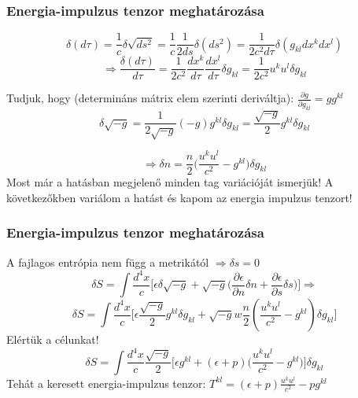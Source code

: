 \documentclass{beamer}
\begin{document}
\begin{frame}
\frametitle{Energia-impulzus tenzor meghatározása}
\begin{equation*}
\delta(d\tau)=\frac{1}{c}\delta\sqrt{ds^2}=\frac{1}{c}\frac{1}{2ds}\delta(ds^2)=\frac{1}{2c^2 d\tau}\delta(g_{kl}dx^kdx^l)
\end{equation*}
\begin{equation*}
\Rightarrow \frac{\delta(d\tau)}{d\tau}=\frac{1}{2c^2}\frac{dx^k}{d\tau}\frac{dx^l}{d\tau}\delta g_{kl}=\frac{1}{2c^2}u^ku^l\delta g_{kl}
\end{equation*}

Tudjuk, hogy (determináns mátrix elem szerinti deriváltja): $\frac{\partial g}{\partial g_{kl}}=g g^{kl}$
\begin{equation*}
\delta \sqrt{-g}=\frac{1}{2\sqrt{-g}}(-g)g^{kl}\delta g_{kl}=\frac{\sqrt{-g}}{2}g^{kl}\delta g_{kl}
\end{equation*}

\begin{equation*}
\Rightarrow \delta n=\frac{n}{2}\bigg(\frac{u^ku^l}{c^2}-g^{kl}\bigg)\delta g_{kl}
\end{equation*}
Most már a hatásban megjelenő minden tag variációját ismerjük! A következőkben variálom a hatást és kapom az energia impulzus tenzort!
\end{frame}

\begin{frame}
\frametitle{Energia-impulzus tenzor meghatározása}
A fajlagos entrópia nem függ a metrikától $\Rightarrow \delta s = 0$ 
\begin{equation*}
\delta S=\int \frac{d^4 x}{c}\bigg[\epsilon \delta \sqrt{-g}+\sqrt{-g}\bigg(\frac{\partial\epsilon}{\partial n}\delta n+\frac{\partial \epsilon}{\partial s}\delta s\bigg)\bigg]\Rightarrow
\end{equation*}
\begin{equation*}
\delta S=\int \frac{d^4 x}{c}\bigg[\epsilon\frac{\sqrt{-g}}{2}g^{kl}\delta g_{kl}+\sqrt{-g}w\frac{n}{2}(\frac{u^ku^l}{c^2}-g^{kl})\delta g_{kl}\bigg]
\end{equation*}
Elértük a célunkat! 
\begin{equation*}
\delta S=\int \frac{d^4 x}{c}\frac{\sqrt{-g}}{2}\bigg[\epsilon g^{kl}+(\epsilon+p)\bigg(\frac{u^ku^l}{c^2}-g^{kl}\bigg)\bigg]\delta g_{kl}
\end{equation*}
Tehát a keresett energia-impulzus tenzor: $T^{kl}=(\epsilon+p)\frac{u^ku^l}{c^2}-pg^{kl}$

\end{frame}
\end{document}

